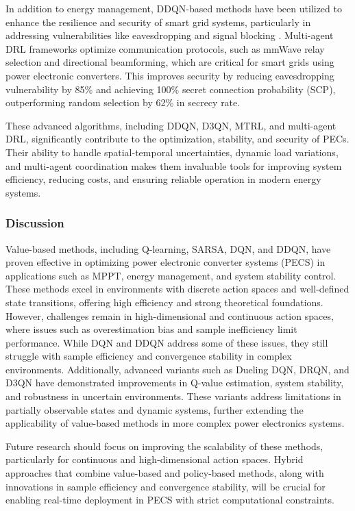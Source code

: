 In addition to energy management, DDQN-based methods have been utilized to enhance the resilience and security of smart grid systems, particularly in addressing vulnerabilities like eavesdropping and signal blocking \cite{lian2023secure}. Multi-agent DRL frameworks optimize communication protocols, such as mmWave relay selection and directional beamforming, which are critical for smart grids using power electronic converters. This improves security by reducing eavesdropping vulnerability by 85\% and achieving 100\% secret connection probability (SCP), outperforming random selection by 62\% in secrecy rate.

These advanced algorithms, including DDQN, D3QN, MTRL, and multi-agent DRL, significantly contribute to the optimization, stability, and security of PECs. Their ability to handle spatial-temporal uncertainties, dynamic load variations, and multi-agent coordination makes them invaluable tools for improving system efficiency, reducing costs, and ensuring reliable operation in modern energy systems.

\subsubsection{Discussion}

Value-based methods, including Q-learning, SARSA, DQN, and DDQN, have proven effective in optimizing power electronic converter systems (PECS) in applications such as MPPT, energy management, and system stability control. These methods excel in environments with discrete action spaces and well-defined state transitions, offering high efficiency and strong theoretical foundations. However, challenges remain in high-dimensional and continuous action spaces, where issues such as overestimation bias and sample inefficiency limit performance. While DQN and DDQN address some of these issues, they still struggle with sample efficiency and convergence stability in complex environments. Additionally, advanced variants such as Dueling DQN, DRQN, and D3QN have demonstrated improvements in Q-value estimation, system stability, and robustness in uncertain environments. These variants address limitations in partially observable states and dynamic systems, further extending the applicability of value-based methods in more complex power electronics systems.

Future research should focus on improving the scalability of these methods, particularly for continuous and high-dimensional action spaces. Hybrid approaches that combine value-based and policy-based methods, along with innovations in sample efficiency and convergence stability, will be crucial for enabling real-time deployment in PECS with strict computational constraints.

